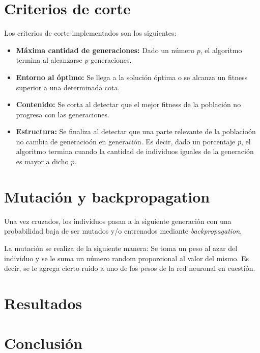 \documentclass[%
    final,
    reprint,
    notitlepage,
    narroweqnarray,
    inline,
    twoside,
    invited
    ]{ieee}
\begin{document}
\section{Criterios de corte}

\par Los criterios de corte implementados son los siguientes:\\

\begin{itemize}
\item \textbf{Máxima cantidad de generaciones:} Dado un número $p$, el algoritmo termina al alcanzarse $p$ generaciones.
\item \textbf{Entorno al óptimo:} Se llega a la solución óptima o se alcanza un fitness superior a una determinada cota.
\item \textbf{Contenido:} Se corta al detectar que el mejor fitness de la población no progresa con las generaciones.
\item \textbf{Estructura:} Se finaliza al detectar que una parte relevante de la poblacioón no cambia de generacioón en generación. Es decir, dado un porcentaje $p$, el algoritmo termina cuando la cantidad de individuos iguales de la generación es mayor a dicho $p$.
\end{itemize}

\section{Mutación y backpropagation}

\par Una vez cruzados, los individuos pasan a la siguiente generación con una probabilidad baja de ser mutados y/o entrenados mediante \textit{backpropagation}.\\
\par La mutación se realiza de la siguiente manera: Se toma un peso al azar del individuo y se le suma un número random proporcional al valor del mismo. Es decir, se le agrega cierto ruido a uno de los pesos de la red neuronal en cuestión.

\section{Resultados}

\section{Conclusión}
\end{document}
